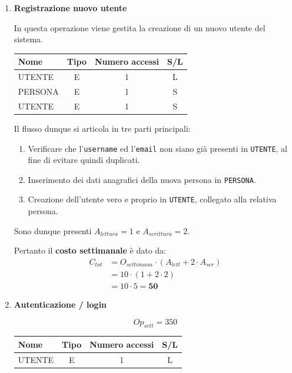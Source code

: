 \documentclass[a4paper,12pt]{report}
\begin{document}
\begin{enumerate}
	\item {\large \textbf{Registrazione nuovo utente}} \label{op1}
	
	In questa operazione viene gestita la creazione di un nuovo utente del sistema.
	
	\begin{table}[H]
    \centering
    \small
    \renewcommand{\arraystretch}{1.15}
    \begin{tabularx}{0.8\textwidth}{|X|c|c|c|}
        \hline
        \rowcolor{gray!20}
        \textbf{Nome} & \textbf{Tipo} & \textbf{Numero accessi} & \textbf{S/L} \\
        \hline
        UTENTE & E & 1 & L \\
        \hline
        PERSONA & E & 1 & S \\
        \hline
        UTENTE & E & 1 & S \\
        \hline
    \end{tabularx}
	\end{table}

	Il flusso dunque si articola in tre parti principali:
	\begin{enumerate}
	\item Verificare che l'\texttt{username} ed l'\texttt{email} non siano già presenti in \texttt{UTENTE}, al fine di evitare quindi duplicati.
	\item Inserimento dei dati anagrafici della nuova persona in \texttt{PERSONA}.
	\item Creazione dell'utente vero e proprio in \texttt{UTENTE}, collegato alla relativa persona.
	\end{enumerate}

	Sono dunque presenti $A_{lettura}=1$ e $A_{scrittura}=2$.
	
	Pertanto il \textbf{costo settimanale} è dato da:
	\begin{align*}
	C_{tot} &= O_{settimana} \cdot (A_{lett} + 2 \cdot A_{scr}) \\
			&= 10 \cdot (1 + 2 \cdot 2) \\
			&= 10 \cdot 5 = \mathbf{50}
	\end{align*}
	

	\item {\large \textbf{Autenticazione / login}} \label{op2}
    
    $$
	{Op}_{sett} = 350
	$$
    
	\begin{table}[H]
    \centering
    \small
    \renewcommand{\arraystretch}{1.15}
    \begin{tabularx}{0.8\textwidth}{|X|c|c|c|}
        \hline
        \rowcolor{gray!20}
        \textbf{Nome} & \textbf{Tipo} & \textbf{Numero accessi} & \textbf{S/L} \\
        \hline
        UTENTE & E & 1 & L \\
        \hline
    \end{tabularx}
	\end{table}
    

\end{enumerate}
\end{document}
